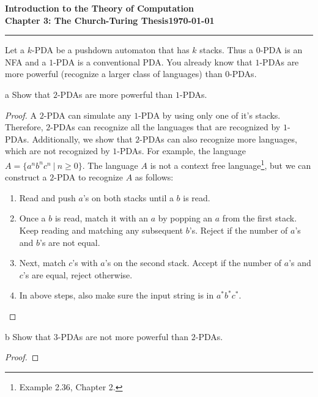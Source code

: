 \documentclass[11pt]{article}
\newcommand{\dated}{\today}
\begin{document}
\textbf{Introduction to the Theory of
Computation}\hfill\textbf{\myname}\\[0.01in]
\textbf{Chapter 3: The Church-Turing Thesis}\hfill\textbf{\dated}\\
\smallskip\hrule\bigskip

\begin{problem}{3.9}
Let a $k$-PDA be a pushdown automaton that has $k$ stacks. Thus a $0$-PDA is an NFA and a $1$-PDA is a conventional PDA. You already know that $1$-PDAs are more powerful (recognize a larger class of languages) than $0$-PDAs.
\end{problem}

\begin{problem}[Part]{a}
Show that $2$-PDAs are more powerful than $1$-PDAs.
\end{problem}

\begin{proof}
A $2$-PDA can simulate any $1$-PDA by using only one of it's stacks. Therefore, $2$-PDAs can recognize all the languages that are recognized by $1$-PDAs. Additionally, we show that $2$-PDAs can also recognize more languages, which are not recognized by $1$-PDAs. For example, the language $A = \{a^nb^nc^n \ | \ n \geq 0 \}$. The language $A$ is not a context free language\footnote{Example 2.36, Chapter 2.}, but we can construct a $2$-PDA to recognize $A$ as follows:
\begin{enumerate}
\item Read and push $a$'s on both stacks until a $b$ is read.
\item Once a $b$ is read, match it with an $a$ by popping an $a$ from the first stack. Keep reading and matching any subsequent $b$'s. Reject if the number of $a$'s and $b$'s are not equal.
\item Next, match $c$'s with $a$'s on the second stack. Accept if the number of $a$'s and $c$'s are equal, reject otherwise.
\item In above steps, also make sure the input string is in $a^*b^*c^*$.
\end{enumerate} 
\end{proof}

\begin{problem}[Part]{b}
Show that $3$-PDAs are not more powerful than $2$-PDAs.
\end{problem}

\begin{proof}

\end{proof}
\end{document}
